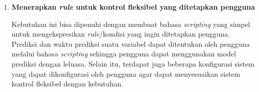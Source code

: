 \begin{enumerate}
    \item \textbf{Menerapkan \textit{rule} untuk kontrol fleksibel yang ditetapkan pengguna}
    
    Kebutuhan ini bisa dipenuhi dengan membuat bahasa \textit{scripting} yang simpel untuk mengekspresikan \textit{rule}/kondisi yang ingin ditetapkan pengguna. Prediksi dan waktu prediksi suatu variabel dapat ditentukan oleh pengguna melalui bahasa \textit{scripting} sehingga pengguna dapat menggunakan model prediksi dengan leluasa. Selain itu, terdapat juga beberapa konfigurasi sistem yang dapat dikonfigurasi oleh pengguna agar dapat menyesuaikan sistem kontrol fleksibel dengan kebutuhan.

\end{enumerate}